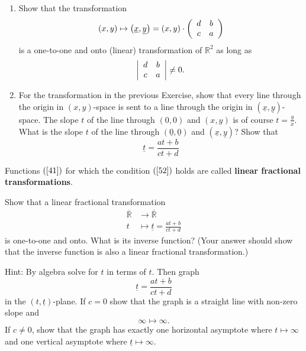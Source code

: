 \begin{exercise}\hfil
\begin{enumerate}
\item Show that the transformation%
\[
\left(  x,y\right)  \mapsto\left(  \underline{x},\underline{y}\right)
=\left(  x,y\right)  \cdot\left(
\begin{array}
[c]{cc}%
d & b\\
c & a
\end{array}
\right)
\]
is a one-to-one and onto (linear) transformation of $\mathbb{R}^{2}$ as long as
\begin{equation}
\left\vert
\begin{array}
[c]{cc}%
d & b\\
c & a
\end{array}
\right\vert \neq0. \label{52}%
\end{equation}

\item For the transformation in the previous Exercise, show that every line through the origin in $\left( x,y\right) $-space is sent to a line
through the origin in $\left( \underline{x},\underline{y}\right)
$-space. The slope $t$ of the line through $\left( 0,0\right) $ and
$\left( x,y\right) $ is of course $t=\frac{y}{x}$. What is the
slope \underline{$t$} of the line through
$\left( \underline{0},\underline{0}\right) $ and $\left(
\underline{x},\underline{y}\right)  $? Show that%
\begin{equation}
\underline{t}=\frac{at+b}{ct+d} \label{41}%
\end{equation}
\end{enumerate}
\end{exercise}

\begin{definition}
Functions $\left( \ref{41}\right) $ for which the condition $\left(
\ref{52}\right)  $ holds are called \textbf{linear fractional transformations}.
\end{definition}


\begin{exercise}
Show that a linear fractional transformation%
\begin{align*}
\overline{\mathbb{R}} &\rightarrow\overline{\mathbb{R}}\\
t &\mapsto\underline{t} =\frac{at+b}{ct+d}%
\end{align*}
is one-to-one and onto. What is its inverse function? (Your answer should show that
the inverse function is also a linear fractional transformation.)

Hint: By algebra solve for $t$ in terms of \underline{$t$}. Then graph%
\[
\underline{t}=\frac{at+b}{ct+d}%
\]
in the $\left(  t,\underline{t}\right)  $-plane. If $c=0$ show that the graph
is a straight line with non-zero slope and%
\[
\infty\mapsto\infty.
\]
If $c\neq0$, show that the graph has exactly one horizontal asymptote where
$t\mapsto\infty$ and one vertical asymptote where $\underline{t}\mapsto\infty$.
\end{exercise}

